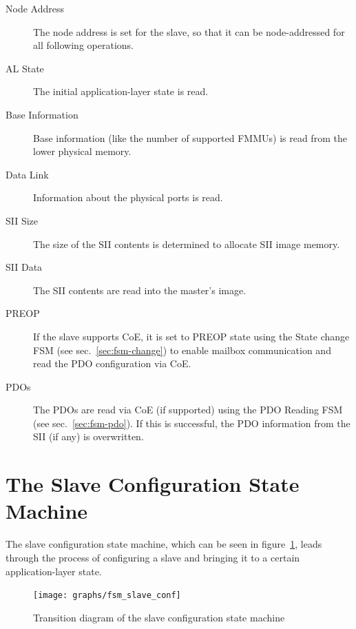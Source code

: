 \documentclass[a4paper,12pt,BCOR6mm,bibtotoc,idxtotoc]{scrbook}
\begin{document}
\begin{description}

\item[Node Address] The node address is set for the slave, so that it can be
node-addressed for all following operations.

\item[AL State] The initial application-layer state is read.

\item[Base Information] Base information (like the number of supported FMMUs)
is read from the lower physical memory.

\item[Data Link] Information about the physical ports is read.

\item[SII Size] The size of the SII contents is determined to allocate SII
image memory.

\item[SII Data] The SII contents are read into the master's image.

\item[PREOP] If the slave supports CoE, it is set to PREOP state using the
State change FSM (see sec.~\ref{sec:fsm-change}) to enable mailbox
communication and read the PDO configuration via CoE.

\item[PDOs] The PDOs are read via CoE (if supported) using the PDO Reading FSM
(see sec.~\ref{sec:fsm-pdo}). If this is successful, the PDO information from
the SII (if any) is overwritten.

\end{description}


\section{The Slave Configuration State Machine}
\label{sec:fsm-conf}

The slave configuration state machine, which can be seen in
figure~\ref{fig:fsm-slaveconf}, leads through the process of configuring a
slave and bringing it to a certain application-layer state.

\begin{figure}[htbp]
  \centering
  \texttt{[image: graphs/fsm\_slave\_conf]}
  \caption{Transition diagram of the slave configuration state
    machine}
  \label{fig:fsm-slaveconf}
\end{figure}
\end{document}
